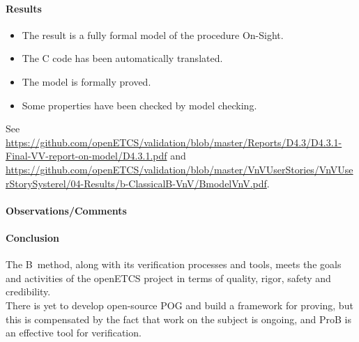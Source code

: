 \paragraph{Results}


\begin{itemize}
\item The result is a fully formal model of the procedure On-Sight.
\item The C code has been automatically  translated.
\item The model  is formally proved.
\item Some properties have been checked by model checking.
\end{itemize}

See {\url{https://github.com/openETCS/validation/blob/master/Reports/D4.3/D4.3.1-Final-VV-report-on-model/D4.3.1.pdf}} and {\url{https://github.com/openETCS/validation/blob/master/VnVUserStories/VnVUserStorySysterel/04-Results/b-ClassicalB-VnV/BmodelVnV.pdf}}.



\paragraph{Observations/Comments}


\paragraph{Conclusion}

The B~method, along with its verification processes and tools, meets the goals and activities of the openETCS project in terms of quality, rigor, safety and credibility.\\
There is yet to develop open-source POG and build a framework for proving, but this is compensated by the fact that work on the subject is ongoing, and ProB is an effective tool for verification.
